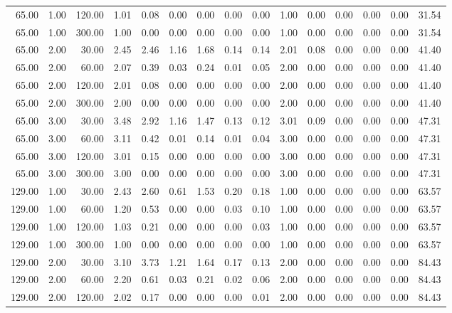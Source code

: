 \begin{table}[ht]
\begin{tabular}{rrrrrrrrrrrrrrr}
  65.00 & 1.00 & 120.00 & 1.01 & 0.08 & 0.00 & 0.00 & 0.00 & 0.00 & 1.00 & 0.00 & 0.00 & 0.00 & 0.00 & 31.54 \\ 
  65.00 & 1.00 & 300.00 & 1.00 & 0.00 & 0.00 & 0.00 & 0.00 & 0.00 & 1.00 & 0.00 & 0.00 & 0.00 & 0.00 & 31.54 \\ 
  65.00 & 2.00 & 30.00 & 2.45 & 2.46 & 1.16 & 1.68 & 0.14 & 0.14 & 2.01 & 0.08 & 0.00 & 0.00 & 0.00 & 41.40 \\ 
  65.00 & 2.00 & 60.00 & 2.07 & 0.39 & 0.03 & 0.24 & 0.01 & 0.05 & 2.00 & 0.00 & 0.00 & 0.00 & 0.00 & 41.40 \\ 
  65.00 & 2.00 & 120.00 & 2.01 & 0.08 & 0.00 & 0.00 & 0.00 & 0.00 & 2.00 & 0.00 & 0.00 & 0.00 & 0.00 & 41.40 \\ 
  65.00 & 2.00 & 300.00 & 2.00 & 0.00 & 0.00 & 0.00 & 0.00 & 0.00 & 2.00 & 0.00 & 0.00 & 0.00 & 0.00 & 41.40 \\ 
  65.00 & 3.00 & 30.00 & 3.48 & 2.92 & 1.16 & 1.47 & 0.13 & 0.12 & 3.01 & 0.09 & 0.00 & 0.00 & 0.00 & 47.31 \\ 
  65.00 & 3.00 & 60.00 & 3.11 & 0.42 & 0.01 & 0.14 & 0.01 & 0.04 & 3.00 & 0.00 & 0.00 & 0.00 & 0.00 & 47.31 \\ 
  65.00 & 3.00 & 120.00 & 3.01 & 0.15 & 0.00 & 0.00 & 0.00 & 0.00 & 3.00 & 0.00 & 0.00 & 0.00 & 0.00 & 47.31 \\ 
  65.00 & 3.00 & 300.00 & 3.00 & 0.00 & 0.00 & 0.00 & 0.00 & 0.00 & 3.00 & 0.00 & 0.00 & 0.00 & 0.00 & 47.31 \\ 
  129.00 & 1.00 & 30.00 & 2.43 & 2.60 & 0.61 & 1.53 & 0.20 & 0.18 & 1.00 & 0.00 & 0.00 & 0.00 & 0.00 & 63.57 \\ 
  129.00 & 1.00 & 60.00 & 1.20 & 0.53 & 0.00 & 0.00 & 0.03 & 0.10 & 1.00 & 0.00 & 0.00 & 0.00 & 0.00 & 63.57 \\ 
  129.00 & 1.00 & 120.00 & 1.03 & 0.21 & 0.00 & 0.00 & 0.00 & 0.03 & 1.00 & 0.00 & 0.00 & 0.00 & 0.00 & 63.57 \\ 
  129.00 & 1.00 & 300.00 & 1.00 & 0.00 & 0.00 & 0.00 & 0.00 & 0.00 & 1.00 & 0.00 & 0.00 & 0.00 & 0.00 & 63.57 \\ 
  129.00 & 2.00 & 30.00 & 3.10 & 3.73 & 1.21 & 1.64 & 0.17 & 0.13 & 2.00 & 0.00 & 0.00 & 0.00 & 0.00 & 84.43 \\ 
  129.00 & 2.00 & 60.00 & 2.20 & 0.61 & 0.03 & 0.21 & 0.02 & 0.06 & 2.00 & 0.00 & 0.00 & 0.00 & 0.00 & 84.43 \\ 
  129.00 & 2.00 & 120.00 & 2.02 & 0.17 & 0.00 & 0.00 & 0.00 & 0.01 & 2.00 & 0.00 & 0.00 & 0.00 & 0.00 & 84.43 \\ 

\end{tabular}
\end{table}
